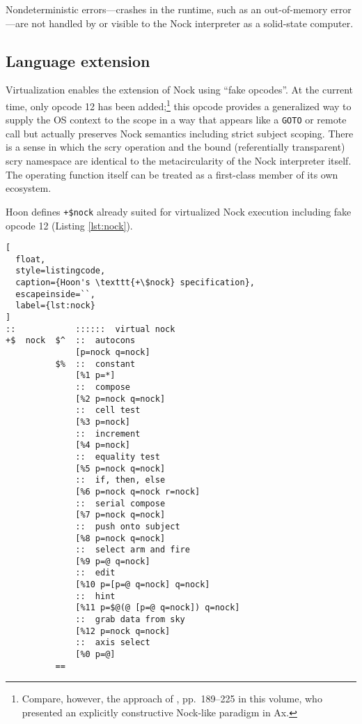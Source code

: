 \documentclass[twoside]{article}
\begin{document}
Nondeterministic errors—crashes in the runtime, such as an out-of-memory error—are not handled by or visible to the Nock interpreter as a solid-state computer.



\subsection{Language extension}

Virtualization enables the extension of Nock using ``fake opcodes''.  At the current time, only opcode 12 has been added;\footnote{Compare, however, the approach of , pp.~189–225 in this volume, who presented an explicitly constructive Nock-like paradigm in Ax.} this opcode provides a generalized way to supply the OS context to the scope in a way that appears like a \texttt{GOTO} or remote call but actually preserves Nock semantics including strict subject scoping.  There is a sense in which the scry operation and the bound (referentially transparent) scry namespace are identical to the metacircularity of the Nock interpreter itself.  The operating function itself can be treated as a first-class member of its own ecosystem.

Hoon defines \lstinline[style=inlinecode]{+$nock} already suited for virtualized Nock execution including fake opcode 12 (Listing \ref{lst:nock}).

\begin{lstlisting}[
  float,
  style=listingcode,
  caption={Hoon's \texttt{+\$nock} specification},
  escapeinside=``,
  label={lst:nock}
]
::            ::::::  virtual nock
+$  nock  $^  ::  autocons
              [p=nock q=nock]
          $%  ::  constant
              [%1 p=*]
              ::  compose
              [%2 p=nock q=nock]
              ::  cell test
              [%3 p=nock]
              ::  increment
              [%4 p=nock]
              ::  equality test
              [%5 p=nock q=nock]
              ::  if, then, else
              [%6 p=nock q=nock r=nock]
              ::  serial compose
              [%7 p=nock q=nock]
              ::  push onto subject
              [%8 p=nock q=nock]
              ::  select arm and fire
              [%9 p=@ q=nock]
              ::  edit
              [%10 p=[p=@ q=nock] q=nock]
              ::  hint
              [%11 p=$@(@ [p=@ q=nock]) q=nock]
              ::  grab data from sky
              [%12 p=nock q=nock]
              ::  axis select
              [%0 p=@]
          ==
\end{lstlisting}
\end{document}
